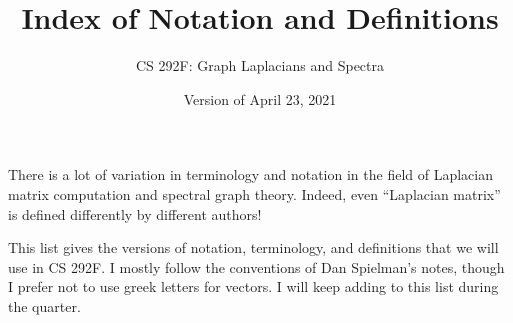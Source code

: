 \documentclass[11pt]{article}
\begin{document}
\title{Index of Notation and Definitions}
\author{CS 292F: Graph Laplacians and Spectra}
\date{Version of April 23, 2021}
\maketitle

There is a lot of variation in terminology and notation in
the field of Laplacian matrix computation and spectral graph 
theory.  
Indeed, even ``Laplacian matrix'' is defined differently by
different authors!

This list gives the versions of notation, terminology, and definitions 
that we will use in CS 292F.
I mostly follow the conventions of Dan Spielman's notes, 
though I prefer not to use greek letters for vectors.
I will keep adding to this list during the quarter.
\end{document}
